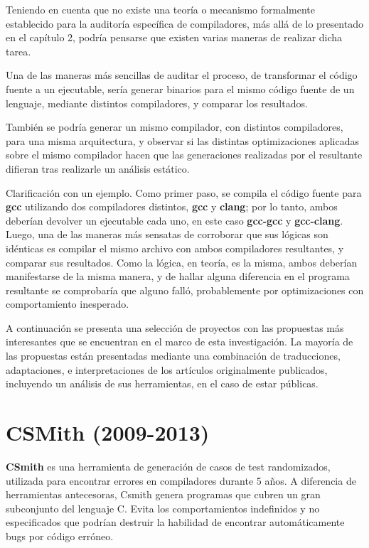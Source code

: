 Teniendo en cuenta que no existe una teoría o mecanismo formalmente establecido para la auditoría específica de compiladores, más allá de lo presentado en el capítulo 2, podría pensarse que existen varias maneras de realizar dicha tarea.

Una de las maneras más sencillas de auditar el proceso, de transformar el código fuente a un ejecutable, sería generar binarios para el mismo código fuente de un lenguaje, mediante distintos compiladores, y comparar los resultados.

También se podría generar un mismo compilador, con distintos compiladores, para una misma arquitectura, y observar si las distintas optimizaciones aplicadas sobre el mismo compilador hacen que las generaciones realizadas por el resultante difieran tras realizarle un análisis estático. 

Clarificación con un ejemplo. Como primer paso, se compila el código fuente para \textbf{gcc} utilizando dos compiladores distintos, \textbf{gcc} y \textbf{clang}; por lo tanto, ambos deberían devolver un ejecutable cada uno, en este caso \textbf{gcc-gcc} y \textbf{gcc-clang}. Luego, una de las maneras más sensatas de corroborar que sus lógicas son idénticas es compilar el mismo archivo con ambos compiladores resultantes, y comparar sus resultados. Como la lógica, en teoría, es la misma, ambos deberían manifestarse de la misma manera, y de hallar alguna diferencia en el programa resultante se comprobaría que alguno falló, probablemente por optimizaciones con comportamiento inesperado.

A continuación se presenta una selección de proyectos con las propuestas más interesantes que se encuentran en el marco de esta investigación. La mayoría de las propuestas están presentadas mediante una combinación de traducciones, adaptaciones, e interpretaciones de los artículos originalmente publicados, incluyendo un análisis de sus herramientas, en el caso de estar públicas.

\section{CSMith (2009-2013)}
\textbf{CSmith} es una herramienta de generación de casos de test randomizados, utilizada para encontrar errores en compiladores durante 5 años. A diferencia de herramientas antecesoras, Csmith genera programas que cubren un gran subconjunto del lenguaje C. Evita los comportamientos indefinidos y no especificados que podrían destruir la habilidad de encontrar automáticamente bugs por código erróneo. 

